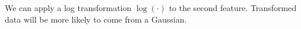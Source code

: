\begin{answer}
We can apply a log transformation $\log(\cdot)$ to the second feature. Transformed data will be more likely to come from a Gaussian. \\
\end{answer}
